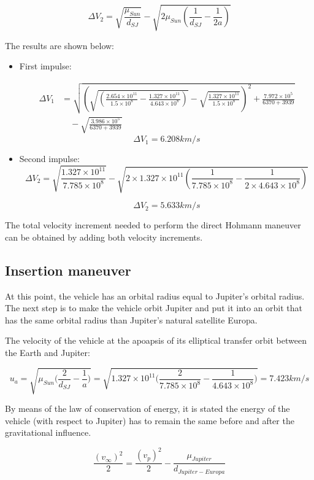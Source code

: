 $$\Delta V_2 = \sqrt{\frac{\mu_{Sun}}{d_{SJ}}}-
\sqrt{2\mu_{Sun}\left(\frac{1}{d_{SJ}}-\frac{1}{2a}\right)}$$
  
The results are shown below:

\begin{itemize}

\item First impulse:

\begin{align*}
\Delta V_1&=\sqrt{\left(\sqrt{\left(\frac{2.654\times10^{11}}{1.5\times10^8}-\frac{1.327\times10^{11}}{4.643\times10^{8}}\right)}-\sqrt{\frac{1.327\times10^{11}}{1.5\times10^{8}}}\right)^2+\frac{7.972\times10^5}{6370+3939}}\\
&\quad-\sqrt{\frac{3.986\times10^5}{6370+3939}}
\end{align*}
$$\Delta V_1= 6.208 km/s $$

\item Second impulse:
$$\Delta V_2 = \sqrt{\frac{1.327\times10^{11}}{7.785\times10^8}}-
\sqrt{2\times1.327\times10^{11}\left(\frac{1}{{7.785\times10^{8}}}-\frac{1}{2\times 4.643\times10^{8}}\right)}$$

$$\Delta{V_2}= 5.633 km/s$$
\end{itemize}
The total velocity increment needed to perform the direct Hohmann maneuver can be obtained by adding both velocity increments.


\subsection{Insertion maneuver}

At this point, the vehicle has an orbital radius equal to Jupiter's orbital radius. The next step is to make the vehicle orbit Jupiter and put it into an orbit that has the same orbital radius than Jupiter's natural satellite Europa. 


The velocity of the vehicle at the apoapsis of its elliptical transfer orbit between the Earth and Jupiter:

 $$u_{a}=\sqrt{\mu_{Sun}\Big(\frac{2}{d_{SJ}}-\frac{1}{a}\Big)}=\sqrt{1.327\times10^{11}\Big(\frac{2}{7.785\times10^{8}}-\frac{1}{4.643\times10^{8}}\Big)} = 7.423 km/s$$
 
 
 By means of the law of conservation of energy, it is stated the energy of the vehicle  (with respect to Jupiter) has to remain the same before and after the gravitational influence. 
 
                $$\frac{(v_{\infty})^2}{2}=\frac{(v_{p})^2}{2}-\frac{\mu_{Jupiter}}{d_{Jupiter-Europa}}$$
                
